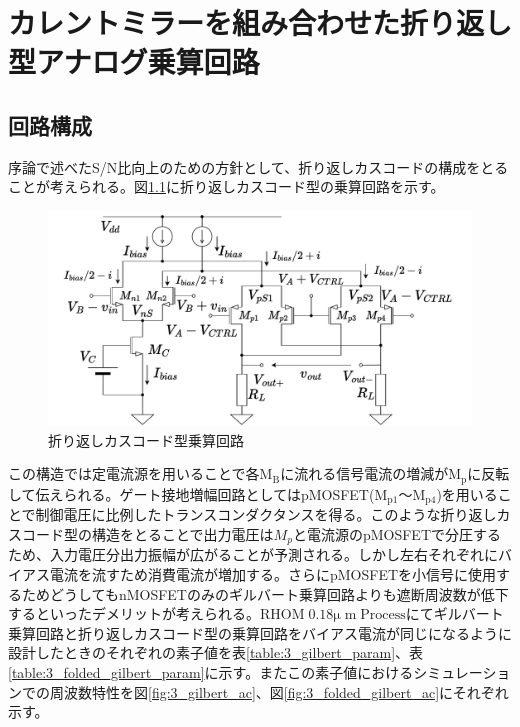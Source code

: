 \chapter{カレントミラーを組み合わせた折り返し型アナログ乗算回路}

    \section{回路構成}
        序論で述べたS/N比向上のための方針として、折り返しカスコードの構成をとることが考えられる。図\ref{fig:3_folded_gilbert}に折り返しカスコード型の乗算回路を示す。
        \begin{figure}[!b]
            \begin{center}
                \includegraphics[width=0.99\linewidth]{figures/chapter3/folded_gilbert.pdf}
                \caption{折り返しカスコード型乗算回路}
                \label{fig:3_folded_gilbert}
            \end{center}
        \end{figure}
        この構造では定電流源を用いることで各$\mathrm{M_{B}}$に流れる信号電流の増減が$\mathrm{M_{p}}$に反転して伝えられる。ゲート接地増幅回路としてはpMOSFET($\mathrm{M_{p1}}$～$\mathrm{M_{p4}}$)を用いることで制御電圧に比例したトランスコンダクタンスを得る。このような折り返しカスコード型の構造をとることで出力電圧は$M_{p}$と電流源のpMOSFETで分圧するため、入力電圧分出力振幅が広がることが予測される。しかし左右それぞれにバイアス電流を流すため消費電流が増加する。さらにpMOSFETを小信号に使用するためどうしてもnMOSFETのみのギルバート乗算回路よりも遮断周波数が低下するといったデメリットが考えられる。$\mathrm{RHOM\;0.18\mu\;m\;Process}$にてギルバート乗算回路と折り返しカスコード型の乗算回路をバイアス電流が同じになるように設計したときのそれぞれの素子値を表\ref{table:3_gilbert_param}、表\ref{table:3_folded_gilbert_param}に示す。またこの素子値におけるシミュレーションでの周波数特性を図\ref{fig:3_gilbert_ac}、図\ref{fig:3_folded_gilbert_ac}にそれぞれ示す。
